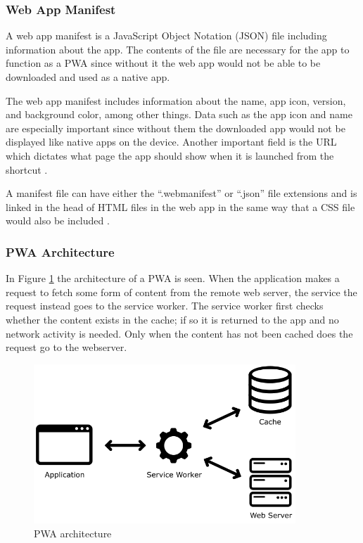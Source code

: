 \documentclass[a4paper,12pt]{article}
\begin{document}
\subsubsection{Web App Manifest}
\label{Theory_PWA_webManifest}
A web app manifest is a JavaScript Object Notation (JSON) file including information about the app. The contents of the file are necessary for the app to function as a PWA since without it the web app would not be able to be downloaded and used as a native app.

The web app manifest includes information about the name, app icon, version, and background color, among other things. Data such as the app icon and name are especially important since without them the downloaded app would not be displayed like native apps on the device. Another important field is the URL which dictates what page the app should show when it is launched from the shortcut \cite{mozilla_webmanifest}.

A manifest file can have either the “.webmanifest” or “.json” file extensions and is linked in the head of HTML files in the web app in the same way that a CSS file would also be included \cite{mozilla_webmanifest}.

\subsubsection{PWA Architecture}
\label{Theory_PWA_architecture}
In Figure \ref{fig:pwaapp} the architecture of a PWA is seen. When the application makes a request to fetch some form of content from the remote web server, the service the request instead goes to the service worker. The service worker first checks whether the content exists in the cache; if so it is returned to the app and no network activity is needed. Only when the content has not been cached does the request go to the webserver.

\begin{figure}[h]%
	\centering
	\includegraphics[height=6cm]{img/Other/struct_pwa.png}
	\caption{PWA architecture}%
	\label{fig:pwaapp}%
\end{figure}
\end{document}
